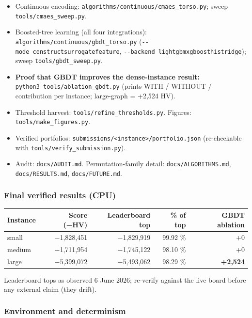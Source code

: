 \documentclass[
  11pt,
]{article}
\providecommand{\tightlist}{%
  \setlength{\itemsep}{0pt}\setlength{\parskip}{0pt}}
\begin{document}
\begin{itemize}
\tightlist
\item
  Continuous encoding: \texttt{algorithms/continuous/cmaes\_torso.py};
  sweep \texttt{tools/cmaes\_sweep.py}.
\item
  Boosted-tree learning (all four integrations):
  \texttt{algorithms/continuous/gbdt\_torso.py}
  (\texttt{-\/-mode\ construct\textbar{}surrogate\textbar{}feature},
  \texttt{-\/-backend\ lightgbm\textbar{}xgboost\textbar{}hist\textbar{}ridge});
  sweep \texttt{tools/gbdt\_sweep.py}.
\item
  \textbf{Proof that GBDT improves the dense-instance result:}
  \texttt{python3\ tools/ablation\_gbdt.py} (prints WITH / WITHOUT /
  contribution per instance; large-graph = +2,524 HV).
\item
  Threshold harvest: \texttt{tools/refine\_thresholds.py}. Figures:
  \texttt{tools/make\_figures.py}.
\item
  Verified portfolios:
  \texttt{submissions/\textless{}instance\textgreater{}/portfolio.json}
  (re-checkable with \texttt{tools/verify\_submission.py}).
\item
  Audit: \texttt{docs/AUDIT.md}. Permutation-family detail:
  \texttt{docs/ALGORITHMS.md}, \texttt{docs/RESULTS.md},
  \texttt{docs/FUTURE.md}.
\end{itemize}

\hypertarget{final-verified-results-cpu}{%
\subsubsection{Final verified results
(CPU)}\label{final-verified-results-cpu}}

\begin{longtable}[]{@{}lrrrr@{}}
\toprule
Instance & Score (−HV) & Leaderboard top & \% of top & GBDT
ablation\tabularnewline
\midrule
\endhead
small & −1,828,451 & −1,829,919 & 99.92 \% & +0\tabularnewline
medium & −1,711,954 & −1,745,122 & 98.10 \% & +0\tabularnewline
large & −5,399,072 & −5,493,062 & 98.29 \% &
\textbf{+2,524}\tabularnewline
\bottomrule
\end{longtable}

Leaderboard tops as observed 6 June 2026; re-verify against the live
board before any external claim (they drift).

\hypertarget{environment-and-determinism}{%
\subsubsection{Environment and
determinism}\label{environment-and-determinism}}
\end{document}
